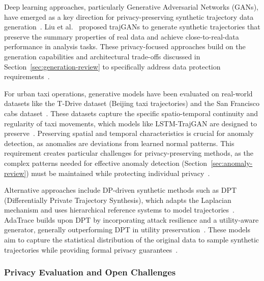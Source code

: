 \documentclass[runningheads]{llncs}
\begin{document}
Deep learning approaches, particularly Generative Adversarial Networks (GANs), have emerged as a key direction for privacy-preserving synthetic trajectory data generation~\cite{Buchholz2024SoK,Liu2018TrajGANs,Rao2021LSTMTrajGAN,Qu2020GANs5G}. Liu et al.~\cite{Liu2018TrajGANs} proposed trajGANs to generate synthetic trajectories that preserve the summary properties of real data and achieve close-to-real-data performance in analysis tasks. These privacy-focused approaches build on the generation capabilities and architectural trade-offs discussed in Section~\ref{sec:generation-review} to specifically address data protection requirements~\cite{Rao2021LSTMTrajGAN,Qu2020GANs5G,Buchholz2024SoK,Ponomareva2023HowToDPfyML}.

For urban taxi operations, generative models have been evaluated on real-world datasets like the T-Drive dataset (Beijing taxi trajectories) and the San Francisco cabs dataset~\cite{Ma2021TrajectoryPrivacy,Primault2014DPLPP,Primault2019LongRoad}. These datasets capture the specific spatio-temporal continuity and regularity of taxi movements, which models like LSTM-TrajGAN are designed to preserve~\cite{Rao2021LSTMTrajGAN,Liu2018TrajGANs,Jin2023SurveyExpStudy}. Preserving spatial and temporal characteristics is crucial for anomaly detection, as anomalies are deviations from learned normal patterns. This requirement creates particular challenges for privacy-preserving methods, as the complex patterns needed for effective anomaly detection (Section~\ref{sec:anomaly-review}) must be maintained while protecting individual privacy~\cite{Rao2021LSTMTrajGAN,Naghizade2020PrivacyContextAware}.

Alternative approaches include DP-driven synthetic methods such as DPT (Differentially Private Trajectory Synthesis), which adapts the Laplacian mechanism and uses hierarchical reference systems to model trajectories~\cite{Chen2011DPTP,Jin2023SurveyExpStudy}. AdaTrace builds upon DPT by incorporating attack resilience and a utility-aware generator, generally outperforming DPT in utility preservation~\cite{Jin2023SurveyExpStudy}. These models aim to capture the statistical distribution of the original data to sample synthetic trajectories while providing formal privacy guarantees~\cite{Jin2023SurveyExpStudy,Qu2020GANs5G}.

\subsubsection{Privacy Evaluation and Open Challenges}
\end{document}
